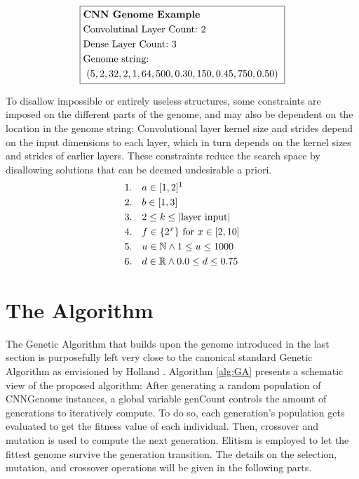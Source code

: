 \documentclass[11pt,a4paper,twoside,openright]{scrbook}
\begin{document}
\begin{equation*}
  \boxed{
    \begin{aligned}
      & \text{\textbf{CNN\ Genome\ Example}} \\
      & \text{Convolutinal\ Layer\ Count:}\ 2 \\
      & \text{Dense\ Layer\ Count:}\ 3 \\
      & \text{Genome\ string:} \\
      & \ (5, 2, 32, 2, 1, 64, 500, 0.30, 150, 0.45, 750, 0.50)\
    \end{aligned}
  }
\end{equation*}

To disallow impossible or entirely useless structures, some constraints are imposed on the different parts of the genome, and may also be dependent on the location in the genome string: Convolutional layer kernel size and strides depend on the input dimensions to each layer, which in turn depends on the kernel sizes and strides of earlier layers. These constraints reduce the search space by disallowing solutions that can be deemed undesirable a priori.
\begin{align*}
  & \text{1.\ \ \ } a \in \text{[}1,2\text{]\footnotemark}  \\
  & \text{2.\ \ \ } b \in \text{[}1,3\text{]}  \\
  & \text{3.\ \ \ } 2 \leq k \leq |\text{layer input}|\\
  & \text{4.\ \ \ } f \in \{2^x\} \text{\ for\ } x \in [2,10]\\
  & \text{5.\ \ \ } u \in \mathbb{N} \land 1 \leq u \leq 1000 \\
  & \text{6.\ \ \ } d \in \mathbb{R} \land 0.0 \leq d \leq 0.75
\end{align*}

\section{The Algorithm}
The Genetic Algorithm that builds upon the genome introduced in the last section is purposefully left very close to the canonical standard Genetic Algorithm as envisioned by Holland \cite{Holland75}. Algorithm \ref{alg:GA} presents a schematic view of the proposed algorithm:
After generating a random population of CNNGenome instances, a global variable genCount controls the amount of generations to iteratively compute. To do so, each generation's population gets evaluated to get the fitness value of each individual. Then, crossover and mutation is used to compute the next generation. Elitism is employed to let the fittest genome survive the generation transition. The details on the selection, mutation, and crossover operations will be given in the following parts.
\end{document}
